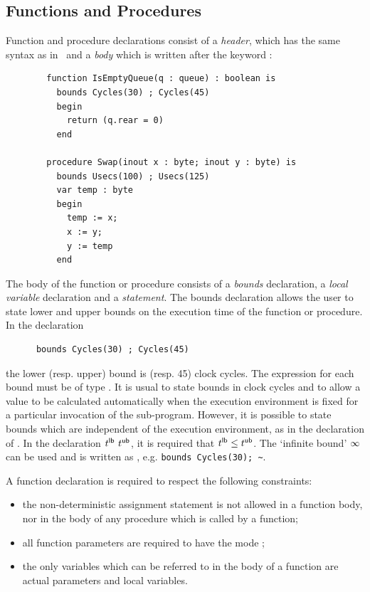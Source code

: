 \subsection{Functions and Procedures}
Function and procedure declarations consist of a \emph{header}, which has 
the same syntax as in \candle\, and a \emph{body} which is written after
the keyword :
\begin{verbatim}
        function IsEmptyQueue(q : queue) : boolean is
          bounds Cycles(30) ; Cycles(45)
          begin
            return (q.rear = 0)
          end
        
        procedure Swap(inout x : byte; inout y : byte) is
          bounds Usecs(100) ; Usecs(125)
          var temp : byte
          begin
            temp := x;
            x := y;
            y := temp
          end
\end{verbatim}
The body of the function or procedure consists of a \emph{bounds}
declaration, a \emph{local variable} declaration and a \emph{statement}.
The bounds declaration allows the user to state
lower and upper bounds on the execution time of the function or procedure.
In the declaration 
\begin{verbatim}
      bounds Cycles(30) ; Cycles(45)
\end{verbatim}
the lower (resp. upper) bound is  (resp. 45) clock
cycles.  The expression for each bound must be of type
. It is usual to state bounds in clock cycles and
to allow a  value to be calculated automatically when
the execution environment is fixed for a particular invocation of the
sub-program. However, it is possible to state bounds which are
independent of the execution environment, as in the declaration of
. In the declaration
 $t^{{\sf lb}}$ \trm{;} $t^{{\sf ub}}$, it is required that $t^{{\sf lb}} \leq t^{{\sf ub}}$. 
The `infinite bound' $\infty$ can be used and is written as \trm{\~{}},
e.g. \verb'bounds Cycles(30); ~'. 

A function declaration is required to respect the following constraints:
\begin{itemize}
\item the non-deterministic assignment statement is not allowed in 
  a function body, nor in the body of any procedure which is called by
  a function;
\item all function parameters are required to have the mode ;
\item the only variables which can be referred to in the body of a function
  are actual parameters and local variables.
\end{itemize}

